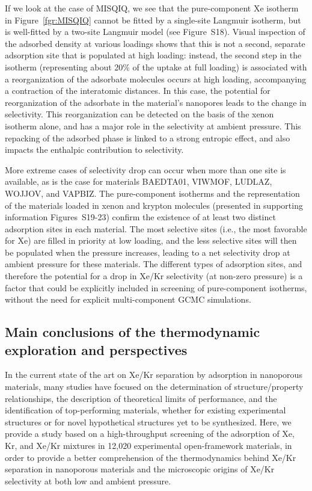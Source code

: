 \documentclass[main.tex]{subfiles}
\begin{document}
  If we look at the case of MISQIQ, we see that the pure-component Xe isotherm in Figure~\ref{fgr:MISQIQ} cannot be fitted by a single-site Langmuir isotherm, but is well-fitted by a two-site Langmuir model (see Figure~S18). Visual inspection of the adsorbed density at various loadings shows that this is not a second, separate adsorption site that is populated at high loading: instead, the second step in the isotherm (representing about {20\%} of the uptake at full loading) is associated with a reorganization of the adsorbate molecules occurs at high loading, accompanying a contraction of the interatomic distances. In this case, the potential for reorganization of the adsorbate in the material's nanopores leads to the change in selectivity. This reorganization can be detected on the basis of the xenon isotherm alone, and has a major role in the selectivity at ambient pressure. This repacking of the adsorbed phase is linked to a strong entropic effect, and also impacts the enthalpic contribution to selectivity.
  
  More extreme cases of selectivity drop can occur when more than one site is available, as is the case for materials BAEDTA01, VIWMOF, LUDLAZ, WOJJOV, and VAPBIZ. The pure-component isotherms and the representation of the materials loaded in xenon and krypton molecules (presented in supporting information Figures~S19-23) confirm the existence of at least two distinct adsorption sites in each material. The most selective sites (i.e., the most favorable for Xe) are filled in priority at low loading, and the less selective sites will then be populated when the pressure increases, leading to a net selectivity drop at ambient pressure for these materials. The different types of adsorption sites, and therefore the potential for a drop in Xe/Kr selectivity (at non-zero pressure) is a factor that could be explicitly included in screening of pure-component isotherms, without the need for explicit multi-component GCMC simulations.

  \subsection{Main conclusions of the thermodynamic exploration and perspectives}

  In the current state of the art on Xe/Kr separation by adsorption in nanoporous materials, many studies have focused on the determination of structure/property relationships, the description of theoretical limits of performance, and the identification of top-performing materials, whether for existing experimental structures or for novel hypothetical structures yet to be synthesized. Here, we provide a study based on a high-throughput screening of the adsorption of Xe, Kr, and Xe/Kr mixtures in 12,020 experimental open-framework materials, in order to provide a better comprehension of the thermodynamics behind Xe/Kr separation in nanoporous materials and the microscopic origins of Xe/Kr selectivity at both low and ambient pressure. 
\end{document}
